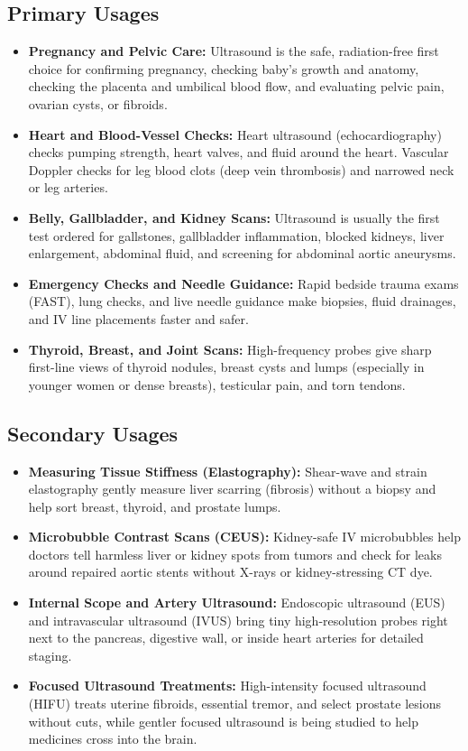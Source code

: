 \subsection{Primary Usages}
\begin{itemize}
  \item \textbf{Pregnancy and Pelvic Care:} Ultrasound is the safe, radiation-free first choice for confirming pregnancy, checking baby's growth and anatomy, checking the placenta and umbilical blood flow, and evaluating pelvic pain, ovarian cysts, or fibroids.
  \item \textbf{Heart and Blood-Vessel Checks:} Heart ultrasound (echocardiography) checks pumping strength, heart valves, and fluid around the heart. Vascular Doppler checks for leg blood clots (deep vein thrombosis) and narrowed neck or leg arteries.
  \item \textbf{Belly, Gallbladder, and Kidney Scans:} Ultrasound is usually the first test ordered for gallstones, gallbladder inflammation, blocked kidneys, liver enlargement, abdominal fluid, and screening for abdominal aortic aneurysms.
  \item \textbf{Emergency Checks and Needle Guidance:} Rapid bedside trauma exams (FAST), lung checks, and live needle guidance make biopsies, fluid drainages, and IV line placements faster and safer.
  \item \textbf{Thyroid, Breast, and Joint Scans:} High-frequency probes give sharp first-line views of thyroid nodules, breast cysts and lumps (especially in younger women or dense breasts), testicular pain, and torn tendons.
\end{itemize}

\subsection{Secondary Usages}
\begin{itemize}
  \item \textbf{Measuring Tissue Stiffness (Elastography):} Shear-wave and strain elastography gently measure liver scarring (fibrosis) without a biopsy and help sort breast, thyroid, and prostate lumps.
  \item \textbf{Microbubble Contrast Scans (CEUS):} Kidney-safe IV microbubbles help doctors tell harmless liver or kidney spots from tumors and check for leaks around repaired aortic stents without X-rays or kidney-stressing CT dye.
  \item \textbf{Internal Scope and Artery Ultrasound:} Endoscopic ultrasound (EUS) and intravascular ultrasound (IVUS) bring tiny high-resolution probes right next to the pancreas, digestive wall, or inside heart arteries for detailed staging.
  \item \textbf{Focused Ultrasound Treatments:} High-intensity focused ultrasound (HIFU) treats uterine fibroids, essential tremor, and select prostate lesions without cuts, while gentler focused ultrasound is being studied to help medicines cross into the brain.
\end{itemize}

